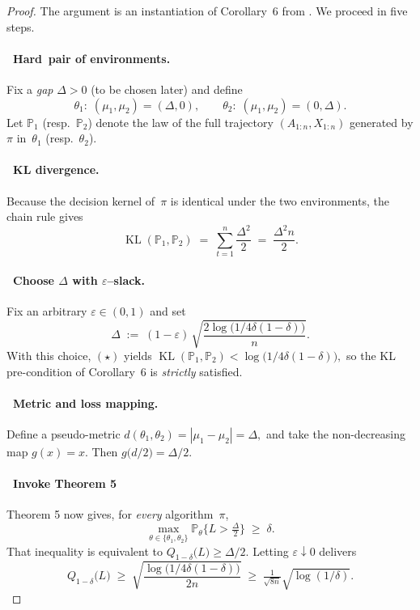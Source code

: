 \documentclass[conference]{IEEEtran}
\begin{document}
\begin{proof}
The argument is an instantiation of Corollary~6 from
\cite{ma2024high}.
We proceed in five steps.

\paragraph{\textbf{~Hard\, pair of environments.}}
Fix a \emph{gap} $\Delta>0$ (to be chosen later) and define
\[
  \theta_1:\; (\mu_1,\mu_2)=(\Delta,0),
  \qquad
  \theta_2:\; (\mu_1,\mu_2)=(0,\Delta).
\]
Let $\mathbb{P}_1$ (resp.\ $\mathbb{P}_2$) denote the law of the full
trajectory $(A_{1:n},X_{1:n})$ generated by $\pi$ in~$\theta_1$ (resp.\ $\theta_2$).

\paragraph{\textbf{~KL divergence.}}
Because the decision kernel of~$\pi$ is identical under the two environments,
the chain rule gives
\[
  \operatorname{KL}(\mathbb{P}_1,\mathbb{P}_2)
    \;=\;
    \sum_{t=1}^{n} 
      \frac{\Delta^{2}}{2}
    \;=\;
    \frac{\Delta^{2}n}{2}.
\tag{$\star$}%
\]

\paragraph{\textbf{~Choose $\Delta$ with $\varepsilon$--slack.}}
Fix an arbitrary $\varepsilon\in(0,1)$ and set
\[
  \Delta
  \;:=\;
  (1-\varepsilon)\,
  \sqrt{
    \frac{2\log\!\bigl(1/4\delta(1-\delta)\bigr)}{n}
  } .
\]
With this choice, $(\star)$ yields
\(
  \operatorname{KL}(\mathbb{P}_1,\mathbb{P}_2)
  < \log\!\bigl(1/4\delta(1-\delta)\bigr),
\)
so the KL pre-condition of Corollary~6 is \emph{strictly} satisfied.

\paragraph{\textbf{~Metric and loss mapping.}}
Define a pseudo-metric
\(
  d(\theta_1,\theta_2)=|\mu_1-\mu_2|=\Delta ,
\)
and take the non-decreasing map $g(x)=x$.
Then
\(
  g\!\bigl(d/2\bigr)=\Delta/2 .
\)

\paragraph{\textbf{~Invoke Theorem 5}}
Theorem 5 now gives, for \emph{every} algorithm~$\pi$,
\[
  \max_{\theta\in\{\theta_1,\theta_2\}}
     \mathbb{P}_\theta\!\bigl\{L>\tfrac{\Delta}{2}\bigr\}
  \;\ge\;
  \delta .
\]
That inequality is equivalent to
\(
  Q_{1-\delta}\bigl(L\bigr)\ge\Delta/2 .
\)
Letting $\varepsilon\downarrow0$ delivers
\[
  Q_{1-\delta}\bigl(L\bigr)
    \;\ge\;
    \sqrt{\frac{\log\bigl(1/4\delta(1-\delta)\bigr)}{2n}}
    \;\ge\;
    \tfrac{1}{\sqrt{8n}}\sqrt{\log(1/\delta)} .
\]


\end{proof}
\end{document}
